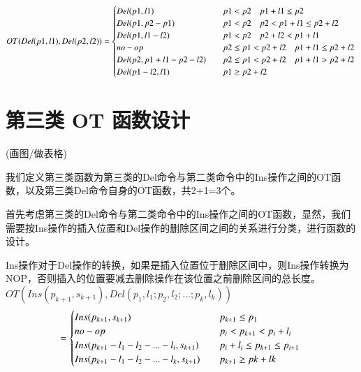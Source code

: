 \begin{equation}
OT(Del(p1,l1),Del(p2,l2))= \begin{cases}
Del(p1,l1) \quad & p1<p2 \quad p1+l1 \le p2 \\
Del(p1,p2-p1) \quad & p1<p2 \quad p2<p1+l1 \le p2+l2\\
Del(p1,l1-l2) \quad & p1<p2 \quad p2+l2<p1+l1\\
no-op \quad & p2 \le p1 < p2+l2 \quad p1+l1 \le p2+l2\\
Del(p2,p1+l1-p2-l2) \quad & p2 \le p1 <p2+l2 \quad  p1+l1>p2+l2\\
Del(p1-l2,l1) \quad & p1 \ge p2+l2  \end{cases}\\
\end{equation}

\section{第三类 OT 函数设计}
(画图/做表格)
\par 我们定义第三类函数为第三类的Del命令与第二类命令中的Ins操作之间的OT函数，以及第三类Del命令自身的OT函数，共2+1=3个。
\par 首先考虑第三类的Del命令与第二类命令中的Ins操作之间的OT函数，显然，我们需要按Ins操作的插入位置和Del操作的删除区间之间的关系进行分类，进行函数的设计。
\par Ins操作对于Del操作的转换，如果是插入位置位于删除区间中，则Ins操作转换为NOP，否则插入的位置要减去删除操作在该位置之前删除区间的总长度。\\
$OT(Ins(p_{k+1},s_{k+1}),Del(p_1,l_1;p_2,l_2;...;p_k,l_k))$\\
\begin{equation}
= \begin{cases}
Ins(p_{k+1},s_{k+1}) \quad & p_{k+1} \le p_1 \\
no-op \quad & p_i<p_{k+1}<p_i+l_i\\
Ins(p_{k+1}-l_1-l_2-...-l_i,s_{k+1}) \quad & p_i+l_i \le p_{k+1} \le p_{i+1}\\
Ins(p_{k+1}-l_1-l_2-...-l_k,s_{k+1}) \quad & p_{k+1} \ge pk+lk \end{cases}\\
\end{equation}

